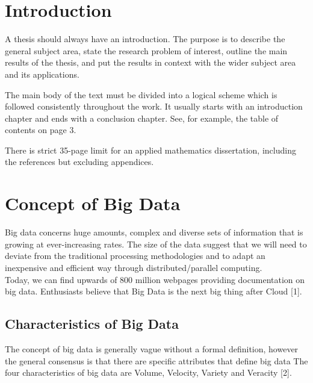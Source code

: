 \documentclass[11pt]{book}
\begin{document}
	
\chapter{Introduction}%

A thesis should always have an introduction.  The purpose is to describe the general subject area, state the research problem of interest, outline the main results of the thesis, and put the results in context with the wider subject area and its applications.

The main body of the text must be divided into a logical scheme which  is followed consistently throughout the work.  
 It usually starts with an introduction chapter  and ends with  a conclusion chapter. See, for example, the table of contents on page 3. 

There is strict  35-page limit  for an applied mathematics dissertation,  including  the references  but excluding  appendices. 

\chapter{Concept of Big Data}

Big data concerns huge amounts, complex and diverse sets of information that is growing at ever-increasing rates. The size of the data suggest that we will need to deviate from the traditional processing methodologies and to adapt an inexpensive and efficient way through distributed/parallel computing.\\

Today, we can find upwards of 800 million webpages providing documentation on big data. Enthusiasts believe that Big Data is the next big thing after Cloud [1]. 

\section{Characteristics of Big Data}

The concept of big data is generally vague without a formal definition, however the general consensus is that there are specific attributes that define big data The four characteristics of big data are Volume, Velocity, Variety and Veracity [2]. 
\end{document}
